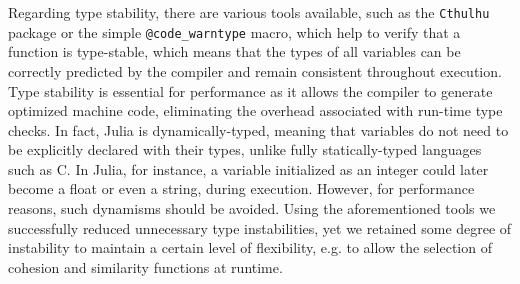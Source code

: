 \documentclass[12pt,	%
	a4paper,		%
	twoside,		%
	openright,		%
	titlepage,%
	]{book}
\theoremstyle{definition}
\newcommand{\mjline}[1]{\texttt{#1}}
\begin{document}
Regarding type stability, there are various tools available, such as the \mjline{Cthulhu} package or the simple \mjline{@code_warntype} macro, which help to verify that a function is type-stable, which means that the types of all variables can be correctly predicted by the compiler and remain consistent throughout execution. Type stability is essential for performance as it allows the compiler to generate optimized machine code, eliminating the overhead associated with run-time type checks. In fact, Julia is dynamically-typed, meaning that variables do not need to be explicitly declared with their types, unlike fully statically-typed languages such as C. In Julia, for instance, a variable initialized as an integer could later become a float or even a string, during execution. However, for performance reasons, such dynamisms should be avoided. Using the aforementioned tools we successfully reduced unnecessary type instabilities, yet we retained some degree of instability to maintain a certain level of flexibility, e.g. to allow the selection of cohesion and similarity functions at runtime.


\end{document}
